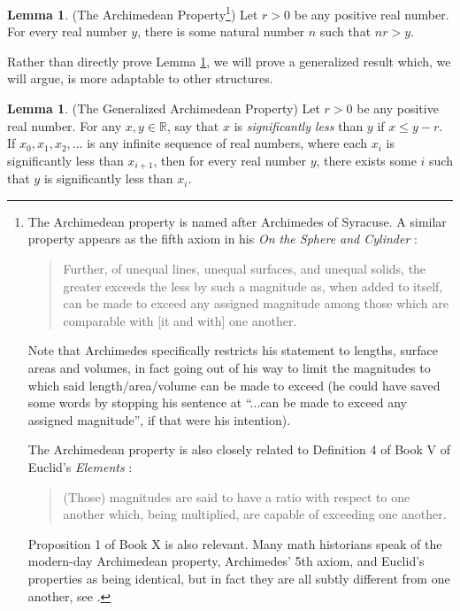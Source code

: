 \documentclass[reqno]{article}
\theoremstyle{definition}
\newtheorem{lemma}[theorem]{Lemma}
\begin{document}
\begin{lemma}
\label{specializedarchimedeanlemma}
(The Archimedean Property\footnote{The Archimedean property is named after Archimedes of Syracuse.
A similar property appears as the fifth axiom in his \emph{On the Sphere
and Cylinder} \cite{archimedes}:
\begin{quote}
    Further, of unequal lines, unequal surfaces, and unequal
    solids, the greater exceeds the less by such a magnitude
    as, when added to itself, can be made to exceed any
    assigned magnitude among those which are comparable with
    [it and with] one another.
\end{quote}
Note that Archimedes specifically restricts his statement to
lengths, surface areas and volumes, in fact going out of his
way to limit the magnitudes to which said length/area/volume
can be made to exceed (he could have saved some words
by stopping his sentence at ``...can be made to exceed any
assigned magnitude'', if that were his intention).

The Archimedean property is also closely related to Definition 4 of Book V of Euclid's
\emph{Elements} \cite{euclid}:
\begin{quote}
    (Those) magnitudes are said to have a ratio
    with respect to one another which, being
    multiplied, are capable of exceeding one
    another.
\end{quote}
Proposition 1 of Book X is also relevant.
Many math historians
speak of the modern-day Archimedean property, Archimedes' 5th axiom, and Euclid's
properties as being identical, but in fact they are all subtly different from one
another, see \cite{bair2013mathematical}.})
Let $r>0$ be any positive real number.
For every real number $y$, there is some natural number $n$
such that $nr>y$.
\end{lemma}

Rather than directly prove Lemma \ref{specializedarchimedeanlemma},
we will prove a generalized result which, we will argue, is
more adaptable to other structures.

\begin{lemma}
\label{generalizedarchimedeanlemma}
(The Generalized Archimedean Property)
Let $r>0$ be any positive real number.
For any $x,y\in\mathbb R$, say that $x$ is \emph{significantly less}
than $y$ if $x\leq y-r$.
If $x_0,x_1,x_2,\ldots$ is any infinite sequence of real numbers,
where each $x_i$ is significantly less than $x_{i+1}$, then for every real number $y$,
there exists some $i$ such that $y$ is significantly less than $x_i$.
\end{lemma}
\end{document}
